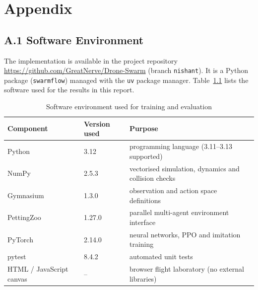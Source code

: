 \chapter{Appendix}
\label{app:commands}

\section*{A.1 Software Environment}
The implementation is available in the project repository \url{https://github.com/GreatNerve/Drone-Swarm}
(branch \texttt{nishant}). It is a Python package (\texttt{swarmflow}) managed with the \texttt{uv} package
manager. Table~\ref{tab:software} lists the software used for the results in this report.

\begin{table}[htbp]
\centering
\caption{Software environment used for training and evaluation}
\label{tab:software}
\small
\begin{tabularx}{\textwidth}{@{}llX@{}}
\toprule
Component & Version used & Purpose\\
\midrule
Python & 3.12 & programming language (3.11--3.13 supported)\\
NumPy & 2.5.3 & vectorised simulation, dynamics and collision checks\\
Gymnasium & 1.3.0 & observation and action space definitions\\
PettingZoo & 1.27.0 & parallel multi-agent environment interface\\
PyTorch & 2.14.0 & neural networks, PPO and imitation training\\
pytest & 8.4.2 & automated unit tests\\
HTML / JavaScript canvas & -- & browser flight laboratory (no external libraries)\\
\bottomrule
\end{tabularx}
\end{table}

